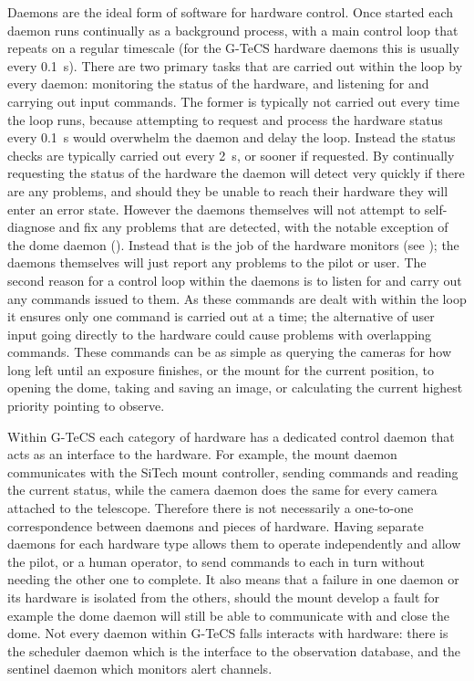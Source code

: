 \begin{colsection}
\begin{colsection}
Daemons are the ideal form of software for hardware control. Once started each daemon runs continually as a background process, with a main control loop that repeats on a regular timescale (for the G-TeCS hardware daemons this is usually every \SI{0.1}{\second}). There are two primary tasks that are carried out within the loop by every daemon: monitoring the status of the hardware, and listening for and carrying out input commands. The former is typically not carried out every time the loop runs, because attempting to request and process the hardware status every \SI{0.1}{\second} would overwhelm the daemon and delay the loop. Instead the status checks are typically carried out every \SI{2}{\second}, or sooner if requested. By continually requesting the status of the hardware the daemon will detect very quickly if there are any problems, and should they be unable to reach their hardware they will enter an error state. However the daemons themselves will not attempt to self-diagnose and fix any problems that are detected, with the notable exception of the dome daemon (). Instead that is the job of the hardware monitors (see ); the daemons themselves will just report any problems to the pilot or user. The second reason for a control loop within the daemons is to listen for and carry out any commands issued to them. As these commands are dealt with within the loop it ensures only one command is carried out at a time; the alternative of user input going directly to the hardware could cause problems with overlapping commands. These commands can be as simple as querying the cameras for how long left until an exposure finishes, or the mount for the current position, to opening the dome, taking and saving an image, or calculating the current highest priority pointing to observe.

Within G-TeCS each category of hardware has a dedicated control daemon that acts as an interface to the hardware. For example, the mount daemon communicates with the SiTech mount controller, sending commands and reading the current status, while the camera daemon does the same for every camera attached to the telescope. Therefore there is not necessarily a one-to-one correspondence between daemons and pieces of hardware. Having separate daemons for each hardware type allows them to operate independently and allow the pilot, or a human operator, to send commands to each in turn without needing the other one to complete. It also means that a failure in one daemon or its hardware is isolated from the others, should the mount develop a fault for example the dome daemon will still be able to communicate with and close the dome. Not every daemon within G-TeCS falls interacts with hardware: there is the scheduler daemon which is the interface to the observation database, and the sentinel daemon which monitors alert channels.


\end{colsection}
\end{colsection}
